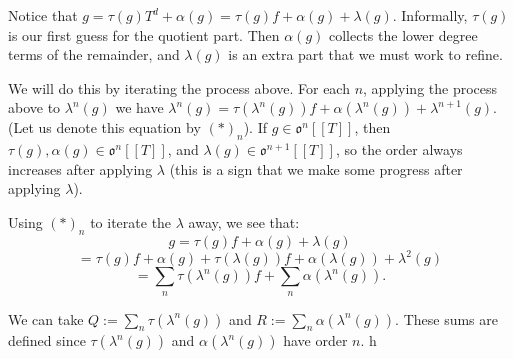 Notice that $g=\tau(g)T^d+\alpha(g)=\tau(g)f+\alpha(g)+\lambda(g)$. Informally, $\tau(g)$ is our first guess for the quotient part. Then $\alpha(g)$ collects the lower degree terms of the remainder, and $\lambda(g)$ is an extra part that we must work to refine. 

We will do this by iterating the process above. For each $n$, applying the process above to $\lambda^n(g)$ we have $\lambda^n(g)=\tau(\lambda^n(g))f+\alpha(\lambda^n(g))+\lambda^{n+1}(g)$. (Let us denote this equation by $(\ast)_n$). If $g\in \mathfrak{o}^n[[T]]$, then $\tau(g),\alpha(g)\in\mathfrak{o}^n[[T]]$, and $\lambda(g)\in\mathfrak{o}^{n+1}[[T]]$, so the order always increases after applying $\lambda$ (this is a sign that we make some progress after applying $\lambda$). 

Using $(\ast)_n$ to iterate the $\lambda$ away, we see that:
$$g=\tau(g)f+\alpha(g)+\lambda(g)$$
$$=\tau(g)f+\alpha(g)+\tau(\lambda(g))f+\alpha(\lambda(g))+\lambda^2(g)$$
$$=\sum_n\tau(\lambda^n(g))f+\sum_n\alpha(\lambda^n(g)).$$

We can take $Q:=\sum_n\tau(\lambda^n(g))$ and $R:=\sum_n\alpha(\lambda^n(g))$. These sums are defined since $\tau(\lambda^n(g))$ and $\alpha(\lambda^n(g))$ have order $n$.
h